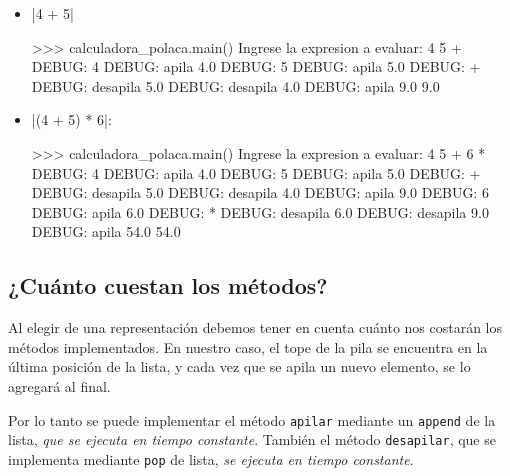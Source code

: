 \begin{itemize}
\item |4 + 5|
\begin{codigo-python-sn}
>>> calculadora_polaca.main()
Ingrese la expresion a evaluar: 4 5 +
DEBUG: 4
DEBUG: apila  4.0
DEBUG: 5
DEBUG: apila  5.0
DEBUG: +
DEBUG: desapila  5.0
DEBUG: desapila  4.0
DEBUG: apila  9.0
9.0
\end{codigo-python-sn}

\item |(4 + 5) * 6|:

\begin{codigo-python-sn}
>>> calculadora_polaca.main()
Ingrese la expresion a evaluar: 4 5 + 6 *
DEBUG: 4
DEBUG: apila  4.0
DEBUG: 5
DEBUG: apila  5.0
DEBUG: +
DEBUG: desapila  5.0
DEBUG: desapila  4.0
DEBUG: apila  9.0
DEBUG: 6
DEBUG: apila  6.0
DEBUG: *
DEBUG: desapila  6.0
DEBUG: desapila  9.0
DEBUG: apila  54.0
54.0
\end{codigo-python-sn}

\end{itemize}


\subsection{¿Cuánto cuestan los métodos?}

Al elegir de una representación debemos tener en cuenta cuánto nos costarán
los métodos implementados. En nuestro caso, el tope de la pila se encuentra
en la última posición de la lista, y cada vez que se apila un nuevo
elemento, se lo agregará al final.

Por lo tanto se puede implementar el método \lstinline!apilar! mediante un
\lstinline!append!  de la lista, {\it que se ejecuta en tiempo constante}.
También el método \lstinline!desapilar!, que se implementa mediante
\lstinline!pop! de lista, {\it se ejecuta en tiempo constante}.

